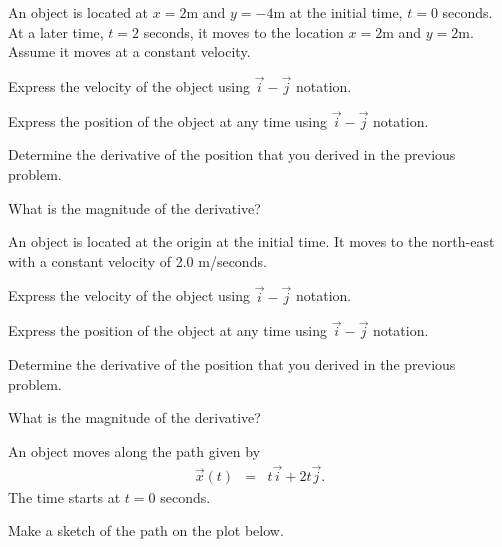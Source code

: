 
\begin{problem}
\item An object is located at $x=2$m and $y=-4$m at the initial time,
  $t=0$ seconds. At a later time, $t=2$ seconds, it moves to the
  location $x=2$m and $y=2$m. Assume it moves at a constant velocity.
  \begin{subproblem}
  \item Express the velocity of the object using $\vec{i}-\vec{j}$
    notation.  
    \vfill
  \item Express the position of the object at any time using
    $\vec{i}-\vec{j}$ notation.
    \vfill
  \item Determine the derivative of the position that you derived in
    the previous problem.
    \vfill
  \item What is the magnitude of the derivative?
    \vfill
  \end{subproblem}

  \clearpage

\item An object is located at the origin at the initial time. It moves
  to the north-east with a constant velocity of 2.0 m/seconds. 

  \begin{subproblem}
  \item Express the velocity of the object using $\vec{i}-\vec{j}$
    notation.  
    \vfill
  \item Express the position of the object at any time using
    $\vec{i}-\vec{j}$ notation.
    \vfill
  \item Determine the derivative of the position that you derived in
    the previous problem.
    \vfill
  \item What is the magnitude of the derivative?
    \vfill
  \end{subproblem}

  \clearpage

\item An object moves along the path given by
  \begin{eqnarray*}
    \vec{x}(t) & = & t \vec{i} + 2 t \vec{j}.
  \end{eqnarray*}
  The time starts at $t=0$ seconds.

  \begin{subproblem}
  \item Make a sketch of the path on the plot below.


\end{subproblem}
\end{problem}
